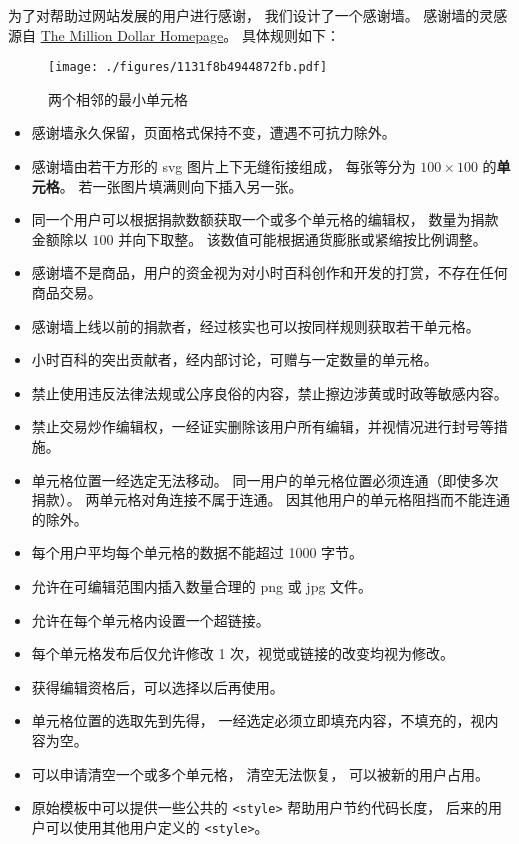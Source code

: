 
\begin{issues}
\issueDraft
{}
\end{issues}

为了对帮助过网站发展的用户进行感谢， 我们设计了一个感谢墙。 感谢墙的灵感源自 \href{https://en.wikipedia.org/wiki/The_Million_Dollar_Homepage}{The Million Dollar Homepage}。 具体规则如下：

\begin{figure}[ht]
\centering
\texttt{[image: ./figures/1131f8b4944872fb.pdf]}
\caption{两个相邻的最小单元格} \label{fig_thanks_1}
\end{figure}

\begin{itemize}
\item 感谢墙永久保留，页面格式保持不变，遭遇不可抗力除外。
\item 感谢墙由若干方形的 svg 图片上下无缝衔接组成， 每张等分为 $100\times 100$ 的\textbf{单元格}。 若一张图片填满则向下插入另一张。
\item 同一个用户可以根据捐款数额获取一个或多个单元格的编辑权， 数量为捐款金额除以 $100$ 并向下取整。 该数值可能根据通货膨胀或紧缩按比例调整。
\item 感谢墙不是商品，用户的资金视为对小时百科创作和开发的打赏，不存在任何商品交易。
\item 感谢墙上线以前的捐款者，经过核实也可以按同样规则获取若干单元格。
\item 小时百科的突出贡献者，经内部讨论，可赠与一定数量的单元格。
\item 禁止使用违反法律法规或公序良俗的内容，禁止擦边涉黄或时政等敏感内容。
\item 禁止交易炒作编辑权，一经证实删除该用户所有编辑，并视情况进行封号等措施。
\item 单元格位置一经选定无法移动。 同一用户的单元格位置必须连通（即使多次捐款）。 两单元格对角连接不属于连通。 因其他用户的单元格阻挡而不能连通的除外。
\item 每个用户平均每个单元格的数据不能超过 1000 字节。
\item 允许在可编辑范围内插入数量合理的 png 或 jpg 文件。
\item 允许在每个单元格内设置一个超链接。
\item 每个单元格发布后仅允许修改 1 次，视觉或链接的改变均视为修改。
\item 获得编辑资格后，可以选择以后再使用。
\item 单元格位置的选取先到先得， 一经选定必须立即填充内容，不填充的，视内容为空。
\item 可以申请清空一个或多个单元格， 清空无法恢复， 可以被新的用户占用。
\item 原始模板中可以提供一些公共的 \verb`<style>` 帮助用户节约代码长度， 后来的用户可以使用其他用户定义的 \verb`<style>`。
\end{itemize}
